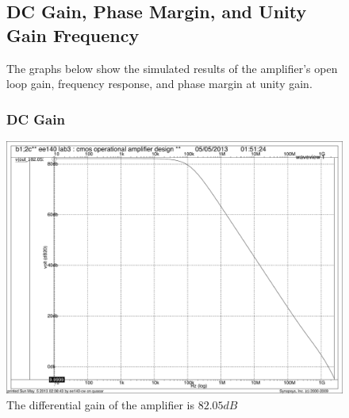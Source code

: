 \documentclass[]{article}
\begin{document}
		
		\begin{figure}
			\subsection{DC Gain, Phase Margin, and Unity Gain Frequency}
			The graphs below show the simulated results of the amplifier's open loop gain, frequency response, and phase margin at unity gain.
				\subsubsection{DC Gain}
				\includegraphics[width=1.1\textwidth]{DC_GAIN_DC_FINAL.pdf}
				\caption{The differential gain of the amplifier is $82.05dB$}
		\end{figure}
		$$$$
\end{document}

